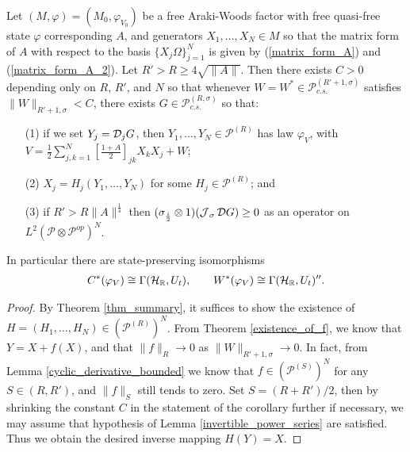 \begin{cor}\label{iso_cor}
Let $(M,\varphi)=(M_0,\varphi_{V_0})$ be a free Araki-Woods factor with free quasi-free state $\varphi$ corresponding $A$, and generators $X_1,\ldots, X_N\in M$ so that the matrix form of $A$ with respect to the basis $\{X_j\Omega\}_{j=1}^N$ is given by (\ref{matrix_form_A}) and (\ref{matrix_form_A_2}). Let $R'>R\geq4\sqrt{\|A\|}$. Then there exists $C>0$ depending only on $R$, $R'$, and $N$ so that whenever $W=W^*\in\mathscr{P}_{c.s.}^{(R'+1,\sigma)}$ satisfies $\|W\|_{R'+1,\sigma}<C$, there exists $G\in \mathscr{P}_{c.s.}^{(R,\sigma)}$ so that:
	\begin{enumerate}
	\item[(1)] if we set $Y_j=\mathcal D_jG$, then $Y_1,\ldots, Y_N\in \mathscr{P}^{(R)}$ has law $\varphi_V$, with $V=\frac{1}{2}\sum_{j,k=1}^N \left[\frac{1+A}{2}\right]_{jk}X_kX_j + W$;
	
	\item[(2)] $X_j=H_j(Y_1,\ldots, Y_N)$ for some $H_j\in \mathscr{P}^{(R)}$; and
	
	\item[(3)] if $R'>R\|A\|^\frac{1}{4}$ then $(\sigma_\frac{i}{2}\otimes 1)(\operatorname{\mathcal J}_\sigma \mathcal D G)\geq 0$ as an operator on $L^2(\mathscr{P}\otimes\mathscr{P}^{op})^N$.
	\end{enumerate}
	
In particular there are state-preserving isomorphisms
	\begin{align*}
		C^*(\varphi_V)\cong \Gamma(\mathcal H_{\mathbb{R}}, U_t),\qquad W^*(\varphi_V)\cong \Gamma(\mathcal H_{\mathbb{R}}, U_t)''.
	\end{align*}
\end{cor}
\begin{proof}
By Theorem \ref{thm_summary}, it suffices to show the existence of $H=(H_1,\ldots, H_N)\in (\mathscr{P}^{(R)})^N$. From Theorem \ref{existence_of_f}, we know that $Y=X+f(X)$, and that $\|f\|_R\rightarrow 0$ as $\|W\|_{R'+1,\sigma}\rightarrow 0$. In fact, from Lemma \ref{cyclic_derivative_bounded} we know that $f\in (\mathscr{P}^{(S)})^N$ for any $S\in (R,R')$, and $\|f\|_S$ still tends to zero. Set $S=(R+R')/2$, then by shrinking the constant $C$ in the statement of the corollary further if necessary, we may assume that hypothesis of Lemma \ref{invertible_power_series} are satisfied. Thus we obtain the desired inverse mapping $H(Y)=X$.
\end{proof}
